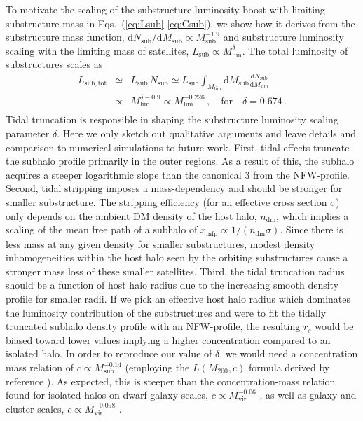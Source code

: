 \documentclass[10pt,aps,pra,reprint,amsmath,amsfonts,amssymb,showpacs,nofootinbib,floatfix]{revtex4-1}
\newcommand{\rmn}{\mathrm}
\newcommand{\sub}{\rmn{sub}}
\newcommand{\dd}{\rmn{d}}
\newcommand{\rs}{\ensuremath{r_s}}
\begin{document}
To motivate the scaling of the substructure luminosity boost with
limiting substructure mass in Eqs.~(\ref{eq:Lsub}-\ref{eq:Csub}), we
show how it derives from the substructure mass function, $\dd
N_\sub/\dd M_\rmn{sub} \propto M_\rmn{sub}^{-1.9}$
\cite{2008MNRAS.391.1685S,2008Natur.456...73S} and substructure
luminosity scaling with the limiting mass of satellites, $L_\sub
\propto M_\rmn{lim}^\delta$. The total luminosity of substructures scales
as
\begin{eqnarray}
  L_\rmn{sub,tot} &\simeq& L_\sub\,N_\sub \simeq L_\sub
\int_{M_\rmn{lim}} \dd M_\rmn{sub} \frac{\dd N_\sub}{\dd M_\rmn{sub}} \nonumber\\
 &\propto& M_\rmn{lim}^{\delta-0.9} \propto M_\rmn{lim}^{-0.226}\,,\quad
\rmn{for}\quad \delta=0.674\,. \nonumber\\
&&
\end{eqnarray}
Tidal truncation is responsible in shaping the substructure luminosity
scaling parameter $\delta$. Here we only sketch out qualitative
arguments and leave details and comparison to numerical simulations to
future work. First, tidal effects truncate the subhalo profile
primarily in the outer regions. As a result of this, the subhalo
acquires a steeper logarithmic slope than the canonical 3 from the
NFW-profile. Second, tidal stripping imposes a mass-dependency and
should be stronger for smaller substructure. The stripping efficiency
(for an effective cross section $\sigma$) only depends on the ambient
DM density of the host halo, $n_\rmn{dm}$, which implies a scaling of
the mean free path of a subhalo of $x_\rmn{mfp} \propto 1/(n_\rmn{dm}
\sigma)$. Since there is less mass at any given density for smaller
substructures, modest density inhomogeneities within the host halo
seen by the orbiting substructures cause a stronger mass loss of these
smaller satellites. Third, the tidal truncation radius should be a
function of host halo radius due to the increasing smooth density
profile for smaller radii. If we pick an effective host halo radius
which dominates the luminosity contribution of the substructures and
were to fit the tidally truncated subhalo density profile with an
NFW-profile, the resulting $\rs$ would be biased toward lower values
implying a higher concentration compared to an isolated halo. In order
to reproduce our value of $\delta$, we would need a concentration mass
relation of $c\propto M_\rmn{sub}^{-0.14}$ (employing the
$L(M_{200},c)$ formula derived by reference
\cite{2009PhRvL.103r1302P}). As expected, this is steeper than the
concentration-mass relation found for isolated halos on dwarf galaxy
scales, $c \propto M_\rmn{vir}^{-0.06}$ \cite{2011arXiv1101.2020I}, as
well as galaxy and cluster scales, $c \propto M_\rmn{vir}^{-0.098}$
\cite{2008MNRAS.391.1940M}.
\end{document}
